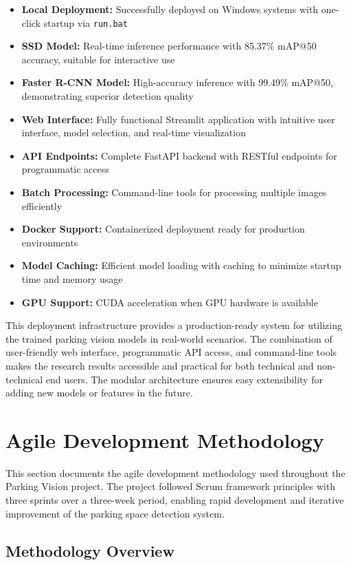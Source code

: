 \documentclass[12pt,a4paper]{article}
\begin{document}
\begin{itemize}
    \item \textbf{Local Deployment:} Successfully deployed on Windows systems with one-click startup via \texttt{run.bat}
    \item \textbf{SSD Model:} Real-time inference performance with 85.37\% mAP@50 accuracy, suitable for interactive use
    \item \textbf{Faster R-CNN Model:} High-accuracy inference with 99.49\% mAP@50, demonstrating superior detection quality
    \item \textbf{Web Interface:} Fully functional Streamlit application with intuitive user interface, model selection, and real-time visualization
    \item \textbf{API Endpoints:} Complete FastAPI backend with RESTful endpoints for programmatic access
    \item \textbf{Batch Processing:} Command-line tools for processing multiple images efficiently
    \item \textbf{Docker Support:} Containerized deployment ready for production environments
    \item \textbf{Model Caching:} Efficient model loading with caching to minimize startup time and memory usage
    \item \textbf{GPU Support:} CUDA acceleration when GPU hardware is available
\end{itemize}

This deployment infrastructure provides a production-ready system for utilizing the trained parking vision models in real-world scenarios. The combination of user-friendly web interface, programmatic API access, and command-line tools makes the research results accessible and practical for both technical and non-technical end users. The modular architecture ensures easy extensibility for adding new models or features in the future.

\section{Agile Development Methodology}

This section documents the agile development methodology used throughout the Parking Vision project. The project followed Scrum framework principles with three sprints over a three-week period, enabling rapid development and iterative improvement of the parking space detection system.

\subsection{Methodology Overview}
\end{document}
